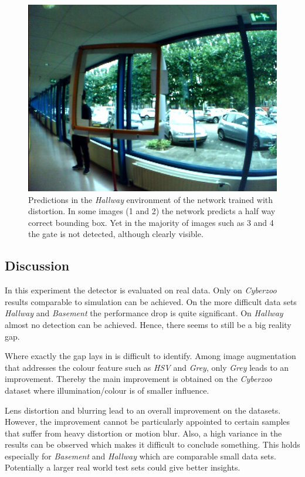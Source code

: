 \begin{figure}[hbtp]
\begin{minipage}{0.24\textwidth}
	\includegraphics[width=\textwidth]{fig/examples/hallway_notnice2.jpg}
\end{minipage}
\caption{Predictions in the \textit{Hallway} environment of the network trained with distortion. In some images (1 and 2) the network predicts a half way correct bounding box. Yet in the majority of images such as 3 and 4 the gate is not detected, although clearly visible. }
\label{fig:example_hallway}
\end{figure}

\subsection{Discussion}

In this experiment the detector is evaluated on real data. Only on \textit{Cyberzoo} results comparable to simulation can be achieved. On the more difficult data sets \textit{Hallway} and \textit{Basement} the performance drop is quite significant. On \textit{Hallway} almost no detection can be achieved. Hence, there seems to still be a big reality gap.

Where exactly the gap lays in is difficult to identify. Among image augmentation that addresses the colour feature such as \textit{HSV} and \textit{Grey}, only \textit{Grey} leads to an improvement. Thereby the main improvement is obtained on the \textit{Cyberzoo} dataset where illumination/colour is of smaller influence. 

Lens distortion and blurring lead to an overall improvement on the datasets. However, the improvement cannot be particularly appointed to certain samples that suffer from heavy distortion or motion blur. Also, a high variance in the results can be observed which makes it difficult to conclude something. This holds especially for \textit{Basement} and \textit{Hallway} which are comparable small data sets. Potentially a larger real world test sets could give better insights.

